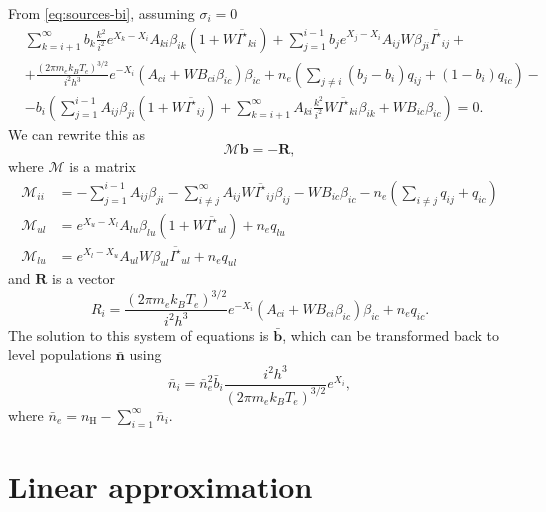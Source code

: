 \documentclass{article}
\begin{document}
From \eqref{eq:sources-bi}, assuming \(\sigma_i = 0\)
\begin{equation}\label{eq:stat-bi}
    \begin{aligned}
        &\sum\limits_{k=i+1}^\infty b_k\frac{k^2}{i^2}e^{X_k-X_i}A_{ki}\beta_{ik}(1 + W\overline{I^\star}_{ki}) + \sum\limits_{j=1}^{i-1} b_je^{X_j-X_i}A_{ij}W\beta_{ji} \overline{I^\star}_{ij} +\\
        &+\frac{(2\pi m_ek_BT_e)^{3/2}}{i^2h^3}e^{-X_i}(A_{ci} + WB_{ci}\beta_{ic})\beta_{ic} +n_e\left(\sum\limits_{j \neq i}(b_j-b_i)q_{ij}  + (1-b_i)q_{ic}\right)-\\
        &-b_i\left(\sum\limits_{j=1}^{i-1}A_{ij}\beta_{ji}(1 + W\overline{I^\star}_{ij}) + \sum\limits_{k=i+1}^\infty A_{ki}\frac{k^2}{i^2}W\overline{I^\star}_{ki}\beta_{ik}  + WB_{ic}\beta_{ic}\right) = 0.
    \end{aligned}
\end{equation}
We can rewrite this as 
\begin{equation}
    \mathcal{M}\mathbf{b} = -\mathbf{R},
\end{equation}
where \(\mathcal{M}\) is a matrix
\begin{equation}
    \begin{aligned}
        \mathcal{M}_{ii} &= -\sum\limits_{j=1}^{i-1}A_{ij}\beta_{ji} - \sum\limits_{i\neq j}^\infty A_{ij}W\overline{I^\star}_{ij}\beta_{ij}  - WB_{ic}\beta_{ic} - n_e\left(\sum\limits_{i\neq j} q_{ij} + q_{ic}\right)\\
        \mathcal{M}_{ul} &= e^{X_u-X_l}A_{lu}\beta_{lu}(1 + W\overline{I^\star}_{ul}) + n_eq_{lu}\\
        \mathcal{M}_{lu} &= e^{X_l-X_u}A_{ul}W\beta_{ul} \overline{I^\star}_{ul} + n_eq_{ul}
    \end{aligned}
\end{equation}
and \(\mathbf{R}\) is a vector
\begin{equation}
    R_i = \frac{(2\pi m_ek_BT_e)^{3/2}}{i^2h^3}e^{-X_i}(A_{ci} + WB_{ci}\beta_{ic})\beta_{ic} + n_eq_{ic}.
\end{equation}
The solution to this system of equations is \(\mathbf{\bar{b}}\), which can be transformed back to level populations \(\mathbf{\bar{n}}\) using
\begin{equation}
    \bar{n}_i = \bar{n}_e^2\bar{b}_i\frac{i^2h^3}{(2\pi m_ek_BT_e)^{3/2}}e^{X_i},
\end{equation}
where \(\bar{n}_e = n_\mathrm{H} - \sum\limits_{i = 1}^{\infty}\bar{n}_i\).

\section{Linear approximation}
\end{document}
